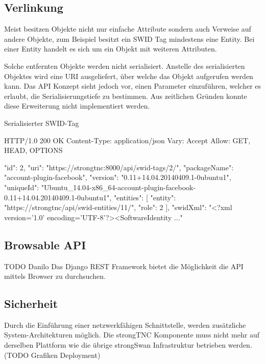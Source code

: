 \subsection{Verlinkung}
Meist besitzen Objekte nicht nur einfache Attribute sondern auch Verweise auf
andere Objekte, zum Beispiel besitzt ein SWID Tag mindestens eine Entity. Bei
einer Entity handelt es sich um ein Objekt mit weiteren Attributen.

Solche entfernten Objekte werden nicht serialisiert. Anstelle des serialisierten
Objektes wird eine URI ausgeliefert, über welche das Objekt aufgerufen werden
kann. Das API Konzept sieht jedoch vor, einen Parameter einzuführen, welcher es
erlaubt, die Serialisierungstiefe zu bestimmen. Aus zeitlichen Gründen konnte
diese Erweiterung nicht implementiert werden.

\begin{listing}
\caption{Serialisierter SWID-Tag}
\begin{httpcode}
HTTP/1.0 200 OK
Content-Type: application/json
Vary: Accept
Allow: GET, HEAD, OPTIONS

{
    "id": 2, 
    "uri": "https://strongtnc:8000/api/swid-tags/2/", 
    "packageName": "account-plugin-facebook", 
    "version": "0.11+14.04.20140409.1-0ubuntu1", 
    "uniqueId": "Ubuntu_14.04-x86_64-account-plugin-facebook-0.11+14.04.20140409.1-0ubuntu1", 
    "entities": [
        {
            "entity": "https://strongtnc/api/swid-entities/11/", 
            "role": 2
        }
    ], 
    "swidXml": "<?xml version='1.0' encoding='UTF-8'?>\n<SoftwareIdentity ..."
}
\end{httpcode}
\end{listing}

\subsection{Browsable API}
TODO Danilo
Das Django REST Framework bietet die Möglichkeit die API mittels Browser zu durchsuchen. 

\subsection{Sicherheit}

Durch die Einführung einer netzwerkfähigen Schnittstelle, werden zusätzliche
System-Ar\-chi\-tek\-tu\-ren möglich. Die strongTNC Komponente muss nicht mehr
auf derselben Plattform wie die übrige strongSwan Infrastruktur betrieben
werden.  (TODO Grafiken Deployment)


